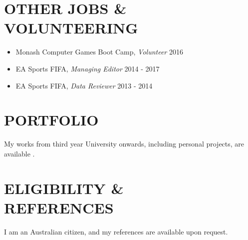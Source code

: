 \documentclass[margin, 10pt]{res} %
\begin{document}
\begin{resume}
\section{OTHER JOBS \& \\ VOLUNTEERING} 

\begin{itemize} \itemsep -11pt
\item Monash Computer Games Boot Camp, {\sl Volunteer} \hfill 2016 \\
\item EA Sports FIFA, {\sl Managing Editor} \hfill 2014 - 2017\\
\item EA Sports FIFA, {\sl Data Reviewer} \hfill 2013 - 2014 \\
 
\end{itemize}




\section{PORTFOLIO} 

My works from third year University onwards, including personal projects, are available \underline{}.


\section{ELIGIBILITY \& \\ REFERENCES} 

I am an Australian citizen, and my references are available upon request.


\end{resume}
\end{document}

